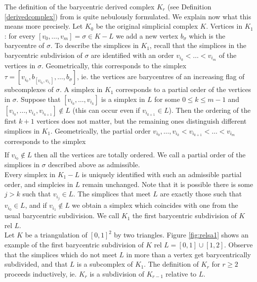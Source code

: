 \documentclass[a4paper,11pt]{article}
\theoremstyle{definition}
\theoremstyle{plain}
\theoremstyle{remark}
\begin{document}
{The definition of the barycentric derived complex $K_{r}$ (see Definition \ref{derivedcomplex}) from \cite{zeeman1964relative} is quite nebulously formulated. We explain now what this means more precisely. Let $K_0$ be the original simplicial complex $K$. Vertices in $K_{1}$: for every $[v_0,\dots, v_m] = \sigma \in K-L$ we add a new vertex $b_{\sigma}$ which is the barycentre of $\sigma$. To describe the simplices in $K_{1}$, recall that the simplices in the barycentric subdivision of $\sigma$ are identified with an order $v_{i_{0}}< \dots <v_{i_{m}}$ of the vertices in $\sigma$. Geometrically, this corresponds to the simplex $\tau=[v_{i_{0}}, b_{[v_{i_{0}},v_{i_{1}}]},\dots,b_{\sigma}]$, ie. the vertices are barycentres of an increasing flag of subcomplexes of $\sigma$. A simplex in $K_{1}$ corresponds to a partial order of the vertices in $\sigma$. Suppose that  $[v_{i_0}, \dots, v_{i_{k}}]$ is a simplex in $L$ for some $0\leq k\leq m-1$ and $[v_{i_0}, \dots, v_{i_{k}}, v_{i_{k+1}}] \notin L$ (this can occur even if $v_{i_{k+1}} \in L$). Then the ordering of the first $k+1$ vertices does not matter, but the remaining ones distinguish different simplices in $K_{1}$. Geometrically, the partial order $v_{i_0},\dots,v_{i_{k}} < v_{i_{k+1}}<\dots< v_{i_{m}}$ corresponds to the simplex 
\begin{align*}
[v_{i_0}, \dots, v_{i_{k}}, b_{[v_{i_0}, \dots, v_{i_{k}}, v_{i_{k+1}}]}, \dots, b_{\sigma}]
\end{align*} 
If $v_{i_0}\notin L$ then all the vertices are totally ordered. We call a partial order of the simplices in $\sigma$ described above as admissible. \\

Every simplex in $K_{1}-L$ is uniquely identified with such an admissible partial order, and simplcies in $L$ remain unchanged. Note that it is possible there is some $j>k$ such that $v_{i_{j}}\in L$. The simplices that meet $L$ are exactly those such that $v_{i_0}\in L$, and if  $v_{i_1}\notin L$ we obtain a simplex which coincides with one from the usual barycentric subdivision. We call $K_1$ the first barycentric subdivision of $K$ rel $L$. \\

Let $K$ be a triangulation of $[0,1]^2$ by two triangles. Figure \ref{fig:relsa1} shows an example of the first barycentric subdivision of $K$ rel $L = [0,1] \cup [1,2]$. Observe that the simplices which do not meet $L$ in more than a vertex get barycentrically subdivided, and that $L$ is a subcomplex of $K_{1}$. The definition of $K_{r}$ for $r\geq 2$ proceeds inductively, ie. $K_{r}$ is a subdivision of $K_{r-1}$ relative to $L$. \\

}
\end{document}
